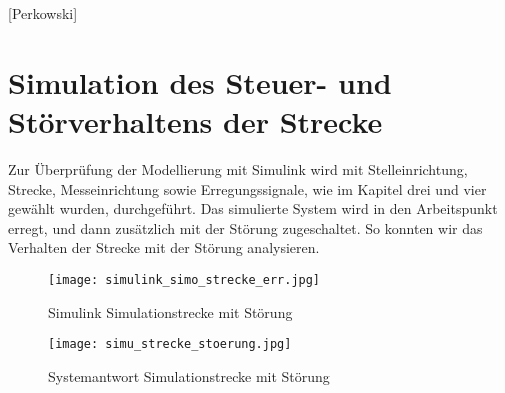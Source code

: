 
\newpage

[Perkowski]
\section{Simulation des Steuer- und Störverhaltens der Strecke} \label{Kapitel5}
Zur Überprüfung der Modellierung mit Simulink wird mit Stelleinrichtung, Strecke, Messeinrichtung sowie Erregungssignale, wie im Kapitel drei und vier gewählt wurden, durchgeführt. Das simulierte System wird in den Arbeitspunkt erregt, und dann zusätzlich mit der Störung zugeschaltet. So konnten wir das Verhalten der Strecke mit der Störung analysieren.

\begin{figure}[h]
	\begin{center}
		\texttt{[image: simulink\_simo\_strecke\_err.jpg]}
		\caption{Simulink Simulationstrecke mit Störung}
       \label{simustreckestor}
	\end{center} 
\end{figure}

\begin{figure}[h]
	\begin{center}
		\texttt{[image: simu\_strecke\_stoerung.jpg]}
		\caption{Systemantwort Simulationstrecke mit Störung}
       \label{plotsimustreckestor}
	\end{center} 
\end{figure}

